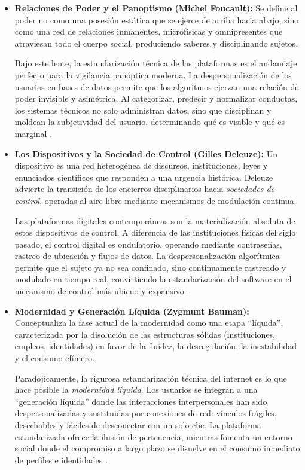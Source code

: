 \begin{itemize}
    \item \textbf{Relaciones de Poder y el Panoptismo (Michel Foucault):} Se define al poder no como una
            posesión estática que se ejerce de arriba hacia abajo, sino como una red de relaciones
            inmanentes, microfísicas y omnipresentes que atraviesan todo el cuerpo social, produciendo
            saberes y disciplinando sujetos.

    Bajo este lente, la estandarización técnica de las plataformas es el andamiaje perfecto para
    la vigilancia panóptica moderna. La despersonalización de los usuarios en bases de datos permite
    que los algoritmos ejerzan una relación de poder invisible y asimétrica. Al categorizar, predecir
    y normalizar conductas, los sistemas técnicos no solo administran datos, sino que disciplinan y
    moldean la subjetividad del usuario, determinando qué es visible y qué es marginal
    \cite{foucault2002vigilar}.

    \item \textbf{Los Dispositivos y la Sociedad de Control (Gilles Deleuze):} Un dispositivo es una
            red heterogénea de discursos, instituciones, leyes y enunciados científicos que
            responden a una urgencia histórica. Deleuze advierte la transición de los encierros
            disciplinarios hacia \textit{sociedades de control}, operadas al aire libre mediante
            mecanismos de modulación continua.

    Las plataformas digitales contemporáneas son la materialización absoluta de estos dispositivos
    de control. A diferencia de las instituciones físicas del siglo pasado, el control digital es
    ondulatorio, operando mediante contraseñas, rastreo de ubicación y flujos de datos.
    La despersonalización algorítmica permite que el sujeto ya no sea confinado, sino
    continuamente rastreado y modulado en tiempo real, convirtiendo la estandarización del
    software en el mecanismo de control más ubicuo y expansivo \cite{deleuze1990postscriptum}.

    \item \textbf{Modernidad y Generación Líquida (Zygmunt Bauman):} Conceptualiza la fase actual
            de la modernidad como una etapa ``líquida'', caracterizada por la disolución de las
            estructuras sólidas (instituciones, empleos, identidades) en favor de la fluidez, la
            desregulación, la inestabilidad y el consumo efímero.

    Paradójicamente, la rigurosa estandarización técnica del internet es lo que hace posible la
    \textit{modernidad líquida}. Los usuarios se integran a una ``generación líquida''
    donde las interacciones interpersonales han sido despersonalizadas y sustituidas por conexiones de
    red: vínculos frágiles, desechables y fáciles de desconectar con un solo clic.
    La plataforma estandarizada ofrece la ilusión de pertenencia, mientras fomenta un entorno social
    donde el compromiso a largo plazo se disuelve en el consumo inmediato de perfiles e
    identidades \cite{bauman2003modernidad}.

\end{itemize}

